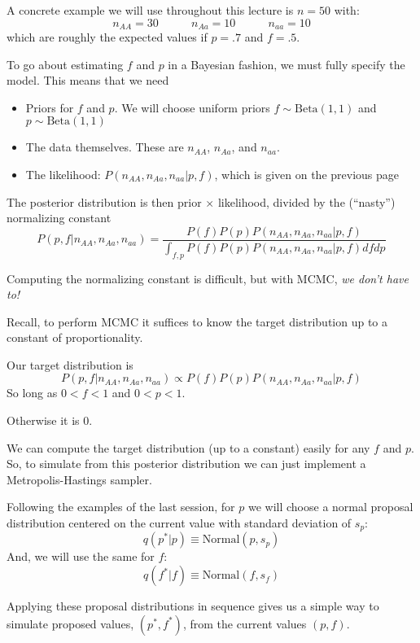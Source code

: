 A concrete example we will use throughout this lecture is $n=50$ with:
\[
n_{AA}=30~~~~~~~~~~~~~n_{Aa}=10~~~~~~~~~~~~~n_{aa}=10
\]
which are roughly the expected values if $p=.7$ and $f=.5$.




To go about estimating $f$ and $p$ in a Bayesian fashion, we must fully specify the model.  This means that we need 
\begin{itemize}
\item Priors for $f$ and $p$.  We will choose uniform priors $f\sim\mathrm{Beta}(1,1)$ and $p\sim\mathrm{Beta}(1,1)$
\item The data themselves.  These are $n_{AA}$, $n_{Aa}$, and $n_{aa}$.
\item The likelihood: $P(n_{AA},n_{Aa},n_{aa}|p,f)$, which is given on the previous page
\end{itemize}
The posterior distribution is then prior $\times$ likelihood, divided by the (``nasty'') normalizing constant
\[
P(p,f|n_{AA},n_{Aa},n_{aa}) = \frac{P(f)P(p)P(n_{AA},n_{Aa},n_{aa}|p,f)}{\int_{f,p}P(f)P(p)P(n_{AA},n_{Aa},n_{aa}|p,f)dfdp}
\]


\newpage
Computing the normalizing constant is difficult, but with MCMC, {\em we don't have to!}

Recall, to perform MCMC it suffices to know the target distribution up to a constant of proportionality. 

Our target distribution is 
\[
P(p,f|n_{AA},n_{Aa},n_{aa}) \propto P(f)P(p)P(n_{AA},n_{Aa},n_{aa}|p,f)
\]
So long as $0< f< 1$ and $0<p<1$.

Otherwise it is 0.


We can compute the target distribution (up to a constant) easily for any $f$ and $p$.   So, to simulate from this posterior distribution we can just implement a Metropolis-Hastings sampler.  

Following the examples of the last session, for $p$ we will choose a normal proposal distribution centered on the current value with standard deviation of $s_p$:
\[
	q(p^*|p) \equiv \mathrm{Normal}(p,s_p)
\]
And, we will use the same for $f$:
\[
	q(f^*|f) \equiv \mathrm{Normal}(f,s_f)
\]

Applying these proposal distributions in sequence gives us a simple way to simulate proposed values, $(p^*,f^*)$, from the current values $(p,f)$.

